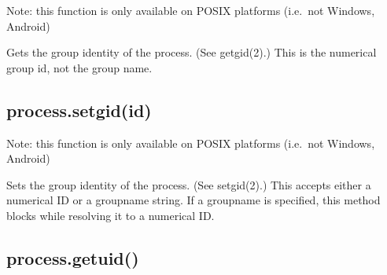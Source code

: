 Note: this function is only available on POSIX platforms (i.e.~not
Windows, Android)

Gets the group identity of the process. (See getgid(2).) This is the
numerical group id, not the group name.

\begin{Shaded}
\begin{Highlighting}[]
 \NormalTok{(}\NormalTok{) \{}
  \NormalTok{(} \NormalTok{+ }\NormalTok{());}
\NormalTok{\}}
\end{Highlighting}
\end{Shaded}

\subsection{process.setgid(id)}

Note: this function is only available on POSIX platforms (i.e.~not
Windows, Android)

Sets the group identity of the process. (See setgid(2).) This accepts
either a numerical ID or a groupname string. If a groupname is
specified, this method blocks while resolving it to a numerical ID.

\begin{Shaded}
\begin{Highlighting}[]
 \NormalTok{(} \NormalTok{&& }\NormalTok{) \{}
  \NormalTok{(} \NormalTok{+ }\NormalTok{());}
   \NormalTok{\{}
    \NormalTok{(}\NormalTok{);}
    \NormalTok{(} \NormalTok{+ }\NormalTok{());}
  \NormalTok{\}}
   
    \NormalTok{(} 
  \NormalTok{\}}
\NormalTok{\}}
\end{Highlighting}
\end{Shaded}

\subsection{process.getuid()}

